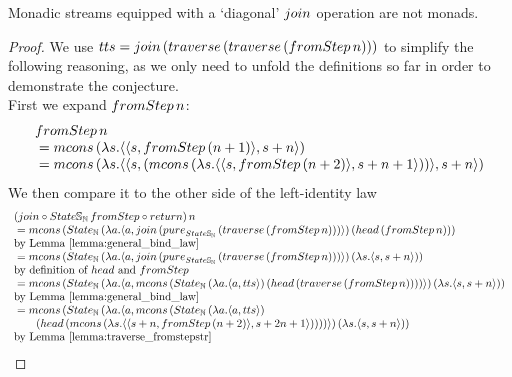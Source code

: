 \begin{theorem}\label{lemma:monad_counterexample}
Monadic streams equipped with a `diagonal' $\join$ operation are not monads.
\end{theorem}
\begin{proof}
We use $tts = \join\, (\mathsf{traverse}\, (\mathsf{traverse}\, (\fromstepstr\, n)))$ to simplify the following reasoning, as we only need to unfold the definitions so far in order to demonstrate the conjecture. \\

First we expand $\fromstepstr\, n$:
$$
\begin{array}{ll}
\fromstepstr\, n \\
{}= \mcons\, (\lambda s. \pair{\pair{s}{\fromstepstr\, (n + 1)}}{s + n})\\
{}= \mcons\, (\lambda s. \pair{\pair{s}{(\mcons\, (\lambda s. \pair{\pair{s}{\fromstepstr\, (n + 2)}}{s + n + 1}))}}{s + n}) \\
\end{array} 
$$
We then compare it to the other side of the left-identity law
$$
\begin{array}{ll}
(\join \comp  \state\stream{\nat}\, \fromstepstr \comp \return)\, n \\
{}= \mcons\, (\state_{\nat} \,(\lambda a . \pair{a}{\join\, (\apure_{\state\stream{\nat}}\, (\mathsf{traverse}\, (\fromstepstr\, n)))})\, (\head\, (\fromstepstr\, n))) \\
 \mbox{by Lemma \ref{lemma:general_bind_law}}  \\
{}= \mcons\, (\state_{\nat}\,(\lambda a . \pair{a}{\join\, (\apure_{\state\stream{\nat}}\,(\mathsf{traverse}\, (\fromstepstr\, n)))})\, (\lambda s. \pair{s}{s + n})) \\
 \mbox{by definition of } \head \mbox{ and } \fromstepstr \\
{}= \mcons\, (\state_{\nat}\,(\lambda a . \pair{a}{  
\mcons\, (\state_{\nat} \,(\lambda a . \pair{a}{tts})\, (\head\, (\mathsf{traverse}\, (\fromstepstr\, n))))
})\, (\lambda s. \pair{s}{s + n})) \\
 \mbox{by Lemma \ref{lemma:general_bind_law}}\\
{}= \mcons\, (\state_{\nat}\,(\lambda a . \pair{a}{  
\mcons\, (\state_{\nat} \,(\lambda a . \pair{a}{tts})\, \\\qquad(\head\, (\mcons\, (\lambda s . \pair{\pair{s+n}{\fromstepstr\, (n + 2)}}{s + 2n + 1}))))
})\, (\lambda s. \pair{s}{s + n})) \\
 \mbox{by Lemma \ref{lemma:traverse_fromstepstr}}\\

\end{array}$$
\end{proof}
